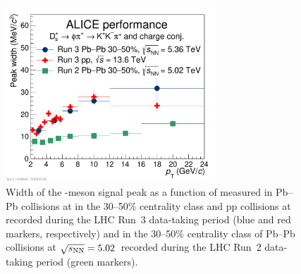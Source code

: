 \begin{figure}
    \centering
    \includegraphics[width=0.7\textwidth]{Figures/Chapter 8/ds_widths_performance.pdf}
    \caption{Width of the \ds-meson signal peak as a function of \pt measured in Pb--Pb collisions at \fivenn in the 30--50\% centrality class and pp collisions at \thirteen recorded during the LHC Run~3 data-taking period  (blue and red markers, respectively) and in the 30--50\% centrality class of Pb--Pb collisions at $\sqrt{s_\mathrm{NN}}=5.02$~\tev recorded during the LHC Run~2 data-taking period (green markers).}
    \label{fig:inv_mass_fit_res_pbpb}
\end{figure}

